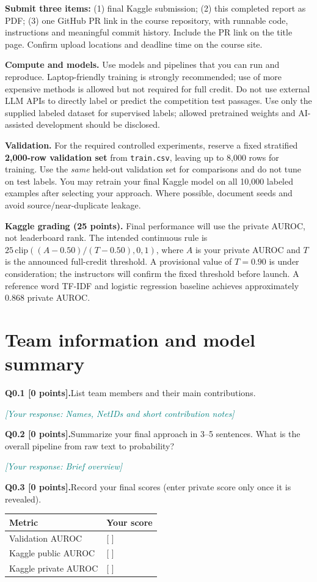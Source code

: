 \documentclass[11pt,letterpaper]{article}
\newcommand{\placeholder}[1]{\par\noindent\textcolor{teal}{\textit{[Your response: #1]}}\par\vspace{0.3em}}
\newcommand{\question}[2]{\needspace{4\baselineskip}\par\addvspace{0.45em}\noindent\textbf{#1}\quad #2\par\nobreak\vspace{0.1em}}
\begin{document}
\textbf{Submit three items:} (1) final Kaggle submission; (2) this completed report as PDF; (3) one GitHub PR link in the course repository, with runnable code, instructions and meaningful commit history. Include the PR link on the title page. Confirm upload locations and deadline time on the course site.

\textbf{Compute and models.} Use models and pipelines that you can run and reproduce. Laptop-friendly training is strongly recommended; use of more expensive methods is allowed but not required for full credit. Do not use external LLM APIs to directly label or predict the competition test passages. Use only the supplied labeled dataset for supervised labels; allowed pretrained weights and AI-assisted development should be disclosed.

\textbf{Validation.} For the required controlled experiments, reserve a fixed stratified \textbf{2,000-row validation set} from \texttt{train.csv}, leaving up to 8,000 rows for training. Use the \emph{same} held-out validation set for comparisons and do not tune on test labels. You may retrain your final Kaggle model on all 10,000 labeled examples after selecting your approach. Where possible, document seeds and avoid source/near-duplicate leakage.

\textbf{Kaggle grading (25 points).} Final performance will use the private AUROC, not leaderboard rank. The intended continuous rule is $25\,\mathrm{clip}((A-0.50)/(T-0.50),0,1)$, where $A$ is your private AUROC and $T$ is the announced full-credit threshold. A provisional value of $T=0.90$ is under consideration; the instructors will confirm the fixed threshold before launch. A reference word TF-IDF and logistic regression baseline achieves approximately 0.868 private AUROC.

\section{Team information and model summary}
\question{Q0.1 [0 points].}{List team members and their main contributions.}
\placeholder{Names, NetIDs and short contribution notes}
\question{Q0.2 [0 points].}{Summarize your final approach in 3--5 sentences. What is the overall pipeline from raw text to probability?}
\placeholder{Brief overview}
\question{Q0.3 [0 points].}{Record your final scores (enter private score only once it is revealed).}
\begin{tabularx}{\linewidth}{@{}Yp{1.8in}@{}}\toprule Metric & Your score \\ \midrule Validation AUROC & [ ] \\ Kaggle public AUROC & [ ] \\ Kaggle private AUROC & [ ] \\ \bottomrule\end{tabularx}
\end{document}
